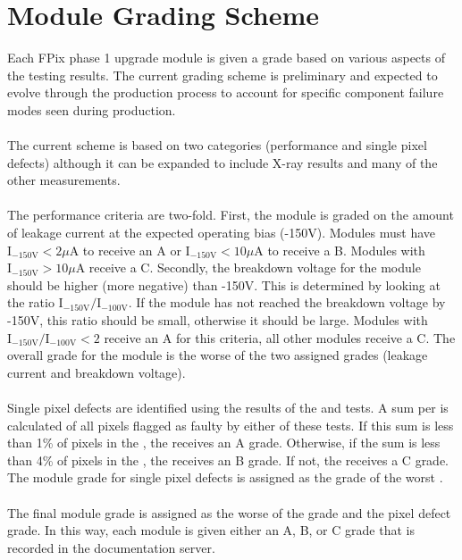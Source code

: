 \section{Module Grading Scheme}
\label{s:grading}



Each FPix phase 1 upgrade module is given a grade based on various aspects of the testing results.
The current grading scheme is preliminary and expected to evolve through the production process
to account for specific component failure modes seen during production.
\\\\
The current scheme is based on two categories (\iv performance and single pixel defects)
although it can be expanded to include X-ray results and many of the other \fulltest measurements.
\\\\
The \iv performance criteria are two-fold.  
First, the module is graded on the amount of leakage current at the expected operating bias (-150V).
Modules must have $\textrm{I}_{-150\textrm{V}} < 2 \mu \textrm{A}$ to receive an A
or $\textrm{I}_{-150\textrm{V}} < 10 \mu \textrm{A}$ to receive a B.
Modules with $\textrm{I}_{-150\textrm{V}} > 10 \mu \textrm{A}$ receive a C.
Secondly, the breakdown voltage for the module should be higher (more negative) than -150V.
This is determined by looking at the ratio $\textrm{I}_{-150\textrm{V}}/\textrm{I}_{-100\textrm{V}}$.
If the module has not reached the breakdown voltage by -150V, this ratio should be small, 
otherwise it should be large.
Modules with $\textrm{I}_{-150\textrm{V}}/\textrm{I}_{-100\textrm{V}} < 2$ receive an A for this criteria,
all other modules receive a C.
The overall \iv grade for the module is the worse of the two assigned grades (leakage current and breakdown voltage).
\\\\
Single pixel defects are identified using the results of the \alivetest and \bb tests.
A sum per \roc is calculated of all pixels flagged as faulty by either of these tests.
If this sum is less than 1\% of pixels in the \roc, the \roc receives an A grade.
Otherwise, if the sum is less than 4\% of pixels in the \roc, the \roc receives an B grade.
If not, the \roc receives a C grade.
The module grade for single pixel defects is assigned as the grade of the worst \roc.
\\\\
The final module grade is assigned as the worse of the \iv grade and the pixel defect grade.
In this way, each module is given either an A, B, or C grade that is recorded in the documentation server.
